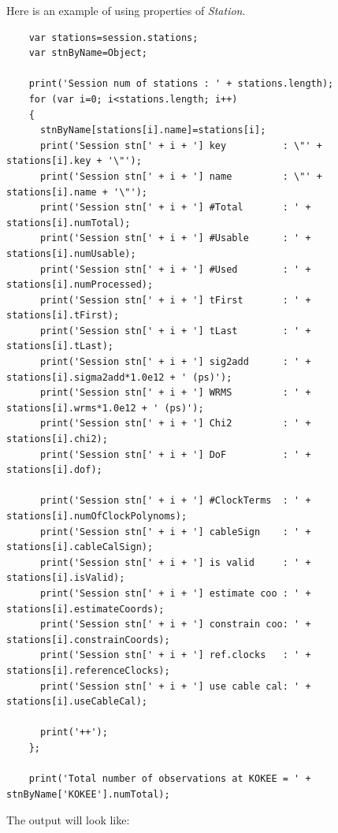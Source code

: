 \documentclass [10pt,letterpaper]{report}
\begin{document}
Here is an example of using properties of {\sl Station}.

{\small\begin{verbatim}
    var stations=session.stations;
    var stnByName=Object;

    print('Session num of stations : ' + stations.length);
    for (var i=0; i<stations.length; i++)
    {
      stnByName[stations[i].name]=stations[i];
      print('Session stn[' + i + '] key          : \"' + stations[i].key + '\"');
      print('Session stn[' + i + '] name         : \"' + stations[i].name + '\"');
      print('Session stn[' + i + '] #Total       : ' + stations[i].numTotal);
      print('Session stn[' + i + '] #Usable      : ' + stations[i].numUsable);
      print('Session stn[' + i + '] #Used        : ' + stations[i].numProcessed);
      print('Session stn[' + i + '] tFirst       : ' + stations[i].tFirst);
      print('Session stn[' + i + '] tLast        : ' + stations[i].tLast);
      print('Session stn[' + i + '] sig2add      : ' + stations[i].sigma2add*1.0e12 + ' (ps)');
      print('Session stn[' + i + '] WRMS         : ' + stations[i].wrms*1.0e12 + ' (ps)');
      print('Session stn[' + i + '] Chi2         : ' + stations[i].chi2);
      print('Session stn[' + i + '] DoF          : ' + stations[i].dof);

      print('Session stn[' + i + '] #ClockTerms  : ' + stations[i].numOfClockPolynoms);
      print('Session stn[' + i + '] cableSign    : ' + stations[i].cableCalSign);
      print('Session stn[' + i + '] is valid     : ' + stations[i].isValid);
      print('Session stn[' + i + '] estimate coo : ' + stations[i].estimateCoords);
      print('Session stn[' + i + '] constrain coo: ' + stations[i].constrainCoords);
      print('Session stn[' + i + '] ref.clocks   : ' + stations[i].referenceClocks);
      print('Session stn[' + i + '] use cable cal: ' + stations[i].useCableCal);

      print('++');
    };

    print('Total number of observations at KOKEE = ' + stnByName['KOKEE'].numTotal);
\end{verbatim}}
\noindent
The output will look like:
\end{document}
